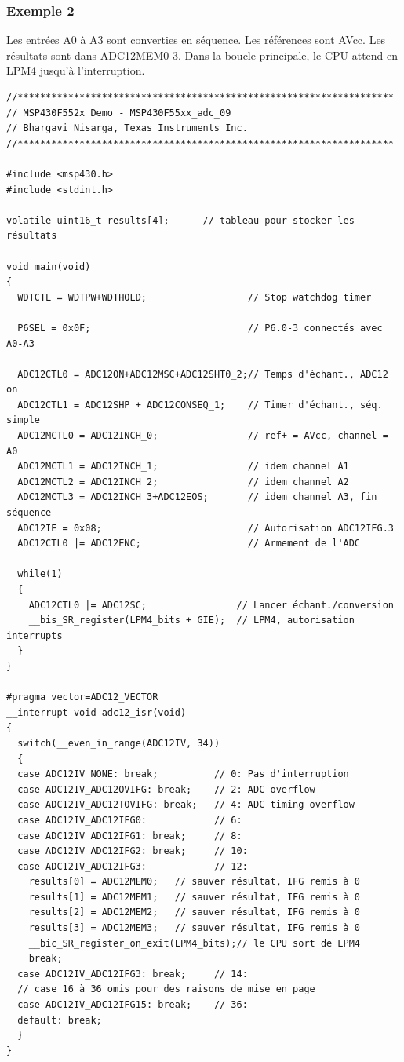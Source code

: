 \begin{minipage}{16cm}{
\subsubsection*{Exemple 2}
Les entrées A0 à A3 sont converties en séquence. Les références sont AVcc.
Les résultats sont dans ADC12MEM0-3. Dans la boucle principale, le CPU attend en LPM4 jusqu'à l'interruption.

\lstset{style=customc}
\begin{lstlisting}
//*******************************************************************
// MSP430F552x Demo - MSP430F55xx_adc_09
// Bhargavi Nisarga, Texas Instruments Inc.
//*******************************************************************

#include <msp430.h>
#include <stdint.h>

volatile uint16_t results[4];      // tableau pour stocker les résultats

void main(void)
{
  WDTCTL = WDTPW+WDTHOLD;                  // Stop watchdog timer

  P6SEL = 0x0F;                            // P6.0-3 connectés avec A0-A3

  ADC12CTL0 = ADC12ON+ADC12MSC+ADC12SHT0_2;// Temps d'échant., ADC12 on
  ADC12CTL1 = ADC12SHP + ADC12CONSEQ_1;    // Timer d'échant., séq. simple
  ADC12MCTL0 = ADC12INCH_0;                // ref+ = AVcc, channel = A0
  ADC12MCTL1 = ADC12INCH_1;                // idem channel A1
  ADC12MCTL2 = ADC12INCH_2;                // idem channel A2
  ADC12MCTL3 = ADC12INCH_3+ADC12EOS;       // idem channel A3, fin séquence
  ADC12IE = 0x08;                          // Autorisation ADC12IFG.3
  ADC12CTL0 |= ADC12ENC;                   // Armement de l'ADC

  while(1)
  {
    ADC12CTL0 |= ADC12SC;                // Lancer échant./conversion
    __bis_SR_register(LPM4_bits + GIE);  // LPM4, autorisation interrupts
  }
}

#pragma vector=ADC12_VECTOR
__interrupt void adc12_isr(void)
{
  switch(__even_in_range(ADC12IV, 34))
  {
  case ADC12IV_NONE: break;          // 0: Pas d'interruption
  case ADC12IV_ADC12OVIFG: break;    // 2: ADC overflow
  case ADC12IV_ADC12TOVIFG: break;   // 4: ADC timing overflow
  case ADC12IV_ADC12IFG0:            // 6: 
  case ADC12IV_ADC12IFG1: break;     // 8:  
  case ADC12IV_ADC12IFG2: break;     // 10:  
  case ADC12IV_ADC12IFG3:            // 12:  
    results[0] = ADC12MEM0;   // sauver résultat, IFG remis à 0
    results[1] = ADC12MEM1;   // sauver résultat, IFG remis à 0
    results[2] = ADC12MEM2;   // sauver résultat, IFG remis à 0
    results[3] = ADC12MEM3;   // sauver résultat, IFG remis à 0
    __bic_SR_register_on_exit(LPM4_bits);// le CPU sort de LPM4
    break;
  case ADC12IV_ADC12IFG3: break;     // 14:
  // case 16 à 36 omis pour des raisons de mise en page
  case ADC12IV_ADC12IFG15: break;    // 36:
  default: break; 
  }
}
\end{lstlisting}
}
\end{minipage}
